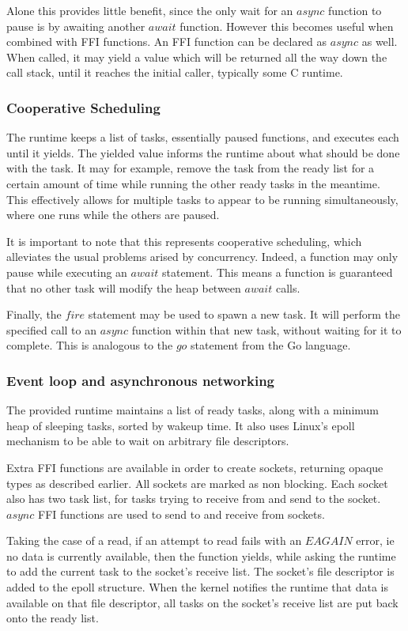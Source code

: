 \documentclass{article}
\begin{document}
Alone this provides little benefit, since the only wait for an $async$ function to pause is by awaiting another $await$
function. However this becomes useful when combined with FFI functions. An FFI function can be declared as $async$ as well.
When called, it may yield a value which will be returned all the way down the call stack, until it reaches the initial
caller, typically some C runtime.

\subsubsection{Cooperative Scheduling}
The runtime keeps a list of tasks, essentially paused functions, and executes each until it yields. The yielded value
informs the runtime about what should be done with the task. It may for example, remove the task from the ready list for
a certain amount of time while running the other ready tasks in the meantime. This effectively allows for multiple tasks to
appear to be running simultaneously, where one runs while the others are paused.

It is important to note that this represents cooperative scheduling, which alleviates the usual problems arised by
concurrency. Indeed, a function may only pause while executing an $await$ statement. This means a function is guaranteed
that no other task will modify the heap between $await$ calls.

Finally, the $fire$ statement may be used to spawn a new task. It will perform the specified call to an $async$ function
within that new task, without waiting for it to complete. This is analogous to the $go$ statement from the Go language.

\subsubsection{Event loop and asynchronous networking}
The provided runtime maintains a list of ready tasks, along with a minimum heap of sleeping tasks, sorted by wakeup time.
It also uses Linux's epoll mechanism to be able to wait on arbitrary file descriptors.

Extra FFI functions are available in order to create sockets, returning opaque types as described earlier. All sockets
are marked as non blocking. Each socket also has two task list, for tasks trying to receive from and send to the socket.
$async$ FFI functions are used to send to and receive from sockets.

Taking the case of a read, if an attempt to read fails with an $EAGAIN$ error, ie no data is currently available, then
the function yields, while asking the runtime to add the current task to the socket's receive list. The socket's file
descriptor is added to the epoll structure. When the kernel notifies the runtime that data is available on that file
descriptor, all tasks on the socket's receive list are put back onto the ready list.
\end{document}
